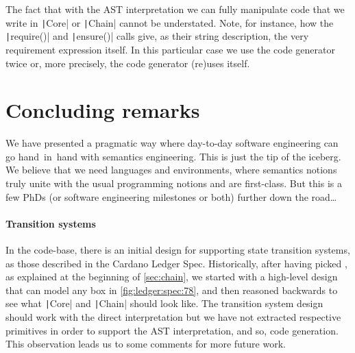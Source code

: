 \documentclass[11pt]{article}
\newcommand{\ScalaI}[1]{\texttt|#1|}
\begin{document}
The fact that with the AST interpretation we can fully manipulate code that we write in \ScalaI{Core} or \ScalaI{Chain} cannot be understated. Note, for instance, how the \ScalaI{require()} and \ScalaI{ensure()} calls give, as their string description, the very requirement expression itself. In this particular case we use the code generator twice or, more precisely, the code generator (re)uses itself.


\section{Concluding remarks}
\label{sec:conclusions}
We have presented a pragmatic way where day-to-day software engineering can go hand~in~hand with semantics engineering. This is just the tip of the iceberg. We believe that we need languages and environments, where semantics notions truly unite with the usual programming notions and are first-class. But this is a few PhDs (or software engineering milestones or both) further down the road\dots

\paragraph*{Transition systems} In the code-base, there is an initial design for supporting state transition systems, as those described in the Cardano Ledger Spec. Historically, after having picked , as explained at the beginning of \autoref{sec:chain}, we started with a high-level design that can model any box in \autoref{fig:ledger:spec:78}, and then reasoned backwards to see what \ScalaI{Core} and \ScalaI{Chain} should look like. The transition system design should work with the direct interpretation but we have not extracted respective primitives in order to support the AST interpretation, and so, code generation. This observation leads us to some comments for more future work.
\end{document}
